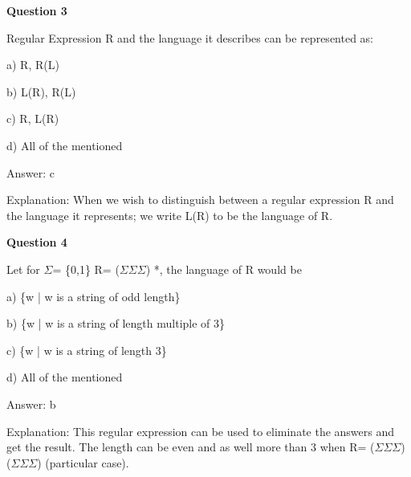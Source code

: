 \documentclass{article}
\begin{document}
\begin{mdframed}[linewidth=1pt, roundcorner=5pt, linecolor=gray!30, backgroundcolor=gray!5]
\textbf{Question 3} 

Regular Expression R and the language it describes can be represented as:

a) R, R(L)

b) L(R), R(L)

c) R, L(R)

d) All of the mentioned
\vspace{5pt} \par
\begin{tcolorbox}[colback=green!5, colframe=green!40!black, title=Solution]
Answer: c

Explanation: When we wish to distinguish between a regular expression R and the language it represents; we write L(R) to be the language of R.
\end{tcolorbox}
\end{mdframed}
\newpage

\begin{mdframed}[linewidth=1pt, roundcorner=5pt, linecolor=gray!30, backgroundcolor=gray!5]
\textbf{Question 4} 

Let for $\Sigma$= \{0,1\} R= ($\Sigma$$\Sigma$$\Sigma$) *, the language of R would be

a) \{w | w is a string of odd length\}

b) \{w | w is a string of length multiple of 3\}

c) \{w | w is a string of length 3\}

d) All of the mentioned
\vspace{5pt} \par
\begin{tcolorbox}[colback=green!5, colframe=green!40!black, title=Solution]
Answer: b

Explanation: This regular expression can be used to eliminate the answers and get the result. The length can be even and as well more than 3 when R= ($\Sigma$$\Sigma$$\Sigma$) ($\Sigma$$\Sigma$$\Sigma$) (particular case).
\end{tcolorbox}
\end{mdframed}
\end{document}
